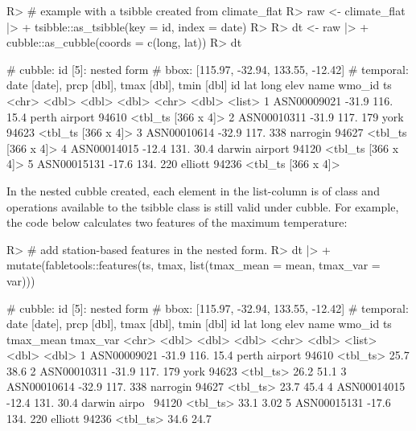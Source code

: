 \documentclass[
]{jss}
\begin{document}
\begin{CodeChunk}
\begin{CodeInput}
R> # example with a tsibble created from climate_flat
R> raw <- climate_flat |>
+   tsibble::as_tsibble(key = id, index = date)
R> 
R> dt <-  raw |>
+   cubble::as_cubble(coords = c(long, lat))
R> dt
\end{CodeInput}
\begin{CodeOutput}
# cubble:   id [5]: nested form
# bbox:     [115.97, -32.94, 133.55, -12.42]
# temporal: date [date], prcp [dbl], tmax [dbl], tmin [dbl]
  id            lat  long  elev name           wmo_id ts                
  <chr>       <dbl> <dbl> <dbl> <chr>           <dbl> <list>            
1 ASN00009021 -31.9  116.  15.4 perth airport   94610 <tbl_ts [366 x 4]>
2 ASN00010311 -31.9  117. 179   york            94623 <tbl_ts [366 x 4]>
3 ASN00010614 -32.9  117. 338   narrogin        94627 <tbl_ts [366 x 4]>
4 ASN00014015 -12.4  131.  30.4 darwin airport  94120 <tbl_ts [366 x 4]>
5 ASN00015131 -17.6  134. 220   elliott         94236 <tbl_ts [366 x 4]>
\end{CodeOutput}
\end{CodeChunk}

In the nested cubble created, each element in the list-column  is of  class and operations available to the tsibble class is still valid under cubble. For example, the code below calculates two features of the maximum temperature:

\begin{CodeChunk}
\begin{CodeInput}
R> # add station-based features in the nested form.
R> dt |>
+   mutate(fabletools::features(ts, tmax, list(tmax_mean = mean, tmax_var = var)))
\end{CodeInput}
\begin{CodeOutput}
# cubble:   id [5]: nested form
# bbox:     [115.97, -32.94, 133.55, -12.42]
# temporal: date [date], prcp [dbl], tmax [dbl], tmin [dbl]
  id            lat  long  elev name          wmo_id ts       tmax_mean tmax_var
  <chr>       <dbl> <dbl> <dbl> <chr>          <dbl> <list>       <dbl>    <dbl>
1 ASN00009021 -31.9  116.  15.4 perth airport  94610 <tbl_ts>      25.7    38.6 
2 ASN00010311 -31.9  117. 179   york           94623 <tbl_ts>      26.2    51.1 
3 ASN00010614 -32.9  117. 338   narrogin       94627 <tbl_ts>      23.7    45.4 
4 ASN00014015 -12.4  131.  30.4 darwin airpo~  94120 <tbl_ts>      33.1     3.02
5 ASN00015131 -17.6  134. 220   elliott        94236 <tbl_ts>      34.6    24.7 
\end{CodeOutput}
\end{CodeChunk}
\end{document}
